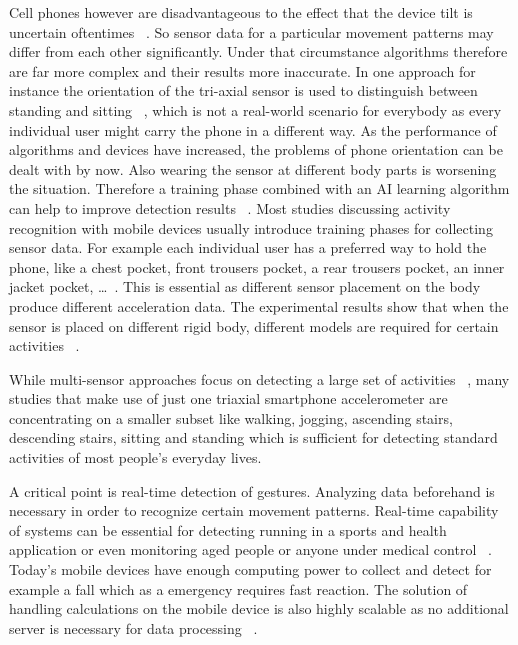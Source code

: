 \documentclass[conference]{IEEEtran}
\begin{document}
Cell phones however are disadvantageous to the effect that the device tilt is uncertain oftentimes ~\cite{Brezmes2009}. So sensor data for a particular movement patterns may differ from each other significantly. Under that circumstance algorithms therefore are far more complex and their results more inaccurate. In one approach for instance the orientation of the tri-axial sensor is used to distinguish between standing and sitting ~\cite{Kwapisz2011}, which is not a real-world scenario for everybody as every individual user might carry the phone in a different way. As the performance of algorithms and devices have increased, the problems of phone orientation can be dealt with by now. Also wearing the sensor at different body parts is worsening the situation. Therefore a training phase combined with an \ac{AI} learning algorithm can help to improve detection results ~\cite{Kwapisz2011,Bao2004}. Most studies discussing activity recognition with mobile devices usually introduce training phases for collecting sensor data. For example each individual user has a preferred way to hold the phone, like a chest pocket, front trousers pocket, a rear trousers pocket, an inner jacket pocket, \dots ~\cite{Brezmes2009}. This is essential as different sensor placement on the body produce different acceleration data. The experimental results show that when the sensor is placed on different rigid body, different models are required for certain activities ~\cite{Henpraserttae2011}.

While multi-sensor approaches focus on detecting a large set of activities ~\cite{Bao2004}, many studies that make use of just one triaxial smartphone accelerometer are concentrating on a smaller subset like walking, jogging, ascending stairs, descending stairs, sitting and standing which is sufficient for detecting standard activities of most people's everyday lives.

A critical point is real-time detection of gestures. Analyzing data beforehand is necessary in order to recognize certain movement patterns. Real-time capability of systems can be essential for detecting running in a sports and health application or even monitoring aged people or anyone under medical control ~\cite{Brezmes2009}. Today's mobile devices have enough computing power to collect and detect for example a fall which as a emergency requires fast reaction. The solution of handling calculations on the mobile device is also highly scalable as no additional server is necessary for data processing ~\cite{Kwapisz2011}.
\end{document}
